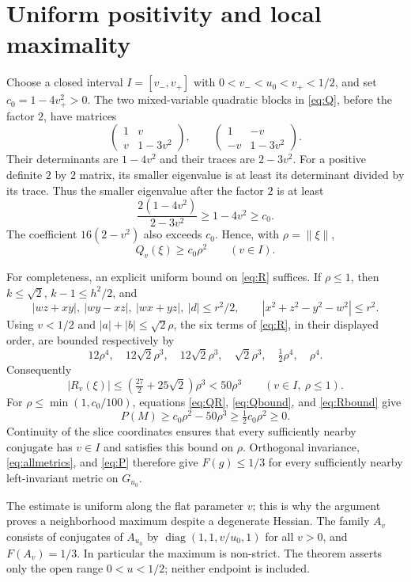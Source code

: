 \documentclass[11pt]{article}
\newcommand{\norm}[1]{\lVert #1\rVert}
\begin{document}
\section{Uniform positivity and local maximality}

Choose a closed interval \(I=[v_-,v_+]\) with
\(0<v_-<u_0<v_+<1/2\), and set \(c_0=1-4v_+^2>0\).
The two mixed-variable quadratic blocks in \eqref{eq:Q}, before the
factor \(2\), have matrices
\[
 \begin{pmatrix}1&v\\v&1-3v^2\end{pmatrix},
 \qquad
 \begin{pmatrix}1&-v\\-v&1-3v^2\end{pmatrix}.
\]
Their determinants are \(1-4v^2\) and their traces are \(2-3v^2\).
For a positive definite \(2\) by \(2\) matrix, its smaller eigenvalue
is at least its determinant divided by its trace. Thus the smaller
eigenvalue after the factor \(2\) is at least
\[
 \frac{2(1-4v^2)}{2-3v^2}\ge 1-4v^2\ge c_0.
\]
The coefficient \(16(2-v^2)\) also exceeds \(c_0\). Hence, with
\(\rho=\norm{\xi}\),
\begin{equation}\label{eq:Qbound}
 Q_v(\xi)\ge c_0\rho^2\qquad(v\in I).
\end{equation}

For completeness, an explicit uniform bound on \eqref{eq:R} suffices.
If \(\rho\le1\), then \(k\le\sqrt2\), \(k-1\le h^2/2\), and
\[
 |wz+xy|,\ |wy-xz|,\ |wx+yz|,\ |d|\le r^2/2,\qquad
 |x^2+z^2-y^2-w^2|\le r^2.
\]
Using \(v<1/2\) and \(|a|+|b|\le\sqrt2\rho\), the six terms of
\eqref{eq:R}, in their displayed order, are bounded respectively by
\[
 12\rho^4,\quad
 12\sqrt2\rho^3,\quad
 12\sqrt2\rho^3,\quad
 \sqrt2\rho^3,\quad
 \tfrac12\rho^4,\quad
 \rho^4.
\]
Consequently
\begin{equation}\label{eq:Rbound}
 |R_v(\xi)|\le(\tfrac{27}{2}+25\sqrt2)\rho^3<50\rho^3
 \qquad(v\in I,\ \rho\le1).
\end{equation}
For \(\rho\le\min(1,c_0/100)\), equations
\eqref{eq:QR}, \eqref{eq:Qbound}, and \eqref{eq:Rbound} give
\[
 P(M)\ge c_0\rho^2-50\rho^3\ge\tfrac12c_0\rho^2\ge0.
\]
Continuity of the slice coordinates ensures that every sufficiently
nearby conjugate has \(v\in I\) and satisfies this bound on \(\rho\).
Orthogonal invariance, \eqref{eq:allmetrics}, and \eqref{eq:P}
therefore give \(F(g)\le1/3\) for every sufficiently nearby
left-invariant metric on \(G_{u_0}\).

The estimate is uniform along the flat parameter \(v\); this is why
the argument proves a neighborhood maximum despite a degenerate
Hessian. The family \(A_v\) consists of conjugates of \(A_{u_0}\)
by \(\operatorname{diag}(1,1,v/u_0,1)\) for all \(v>0\),
and \(F(A_v)=1/3\). In particular the maximum is
non-strict. The theorem asserts only the open range \(0<u<1/2\);
neither endpoint is included.
\end{document}
